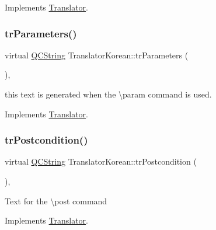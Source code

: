 Implements \mbox{\hyperlink{class_translator}{Translator}}.

\mbox{\label{class_translator_korean_ade647bddb19c4560a822af54604e6cb6}} 
\subsubsection{\texorpdfstring{trParameters()}{trParameters()}}
{\footnotesize\ttfamily virtual \mbox{\hyperlink{class_q_c_string}{Q\+C\+String}} Translator\+Korean\+::tr\+Parameters (\begin{DoxyParamCaption}{ }\end{DoxyParamCaption})\hspace{0.3cm}{\ttfamily [inline]}, {\ttfamily [virtual]}}

this text is generated when the \textbackslash{}param command is used. 

Implements \mbox{\hyperlink{class_translator}{Translator}}.

\mbox{\label{class_translator_korean_a6aa0eed34fcb8f4d511ff26299e45ad1}} 
\subsubsection{\texorpdfstring{trPostcondition()}{trPostcondition()}}
{\footnotesize\ttfamily virtual \mbox{\hyperlink{class_q_c_string}{Q\+C\+String}} Translator\+Korean\+::tr\+Postcondition (\begin{DoxyParamCaption}{ }\end{DoxyParamCaption})\hspace{0.3cm}{\ttfamily [inline]}, {\ttfamily [virtual]}}

Text for the \textbackslash{}post command 

Implements \mbox{\hyperlink{class_translator}{Translator}}.

\mbox{\label{class_translator_korean_a3f7b1b72bb394aefeb1310f00f9ee604}} 
